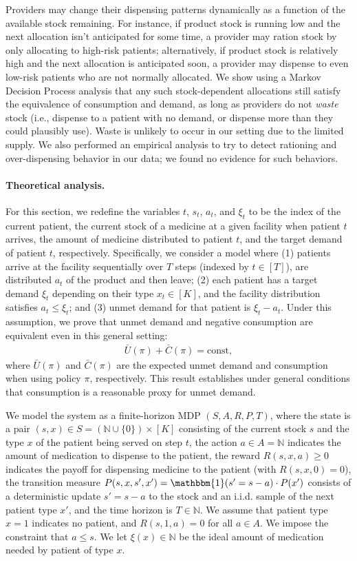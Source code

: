\documentclass[12pt]{article}
\begin{document}
Providers may change their dispensing patterns dynamically as a function of the available stock remaining. For instance, if product stock is running low and the next allocation isn't anticipated for some time, a provider may ration stock by only allocating to high-risk patients; alternatively, if product stock is relatively high and the next allocation is anticipated soon, a provider may dispense to even low-risk patients who are not normally allocated. We show using a Markov Decision Process analysis that any such stock-dependent allocations still satisfy the equivalence of consumption and demand, as long as providers do not \textit{waste} stock (i.e., dispense to a patient with no demand, or dispense more than they could plausibly use). Waste is unlikely to occur in our setting due to the limited supply. We also performed an empirical analysis to try to detect rationing and over-dispensing behavior in our data; we found no evidence for such behaviors.

\paragraph{Theoretical analysis.} For this section, we redefine the variables $t$, $s_t$, $a_t$, and $\xi_t$ to be the index of the current patient, the current stock of a medicine at a given facility when patient $t$ arrives, the amount of medicine distributed to patient $t$, and the target demand of patient $t$, respectively. Specifically, we consider a model where (1) patients arrive at the facility sequentially over $T$ steps (indexed by $t\in[T]$), are distributed $a_t$ of the product and then leave; (2) each patient has a target demand $\xi_t$ depending on their type $x_t\in[K]$, and the facility distribution satisfies $a_t\le\xi_t$; and (3) unmet demand for that patient is $\xi_t-a_t$. Under this assumption, we prove that unmet demand and negative consumption are equivalent even in this general setting:
\begin{align*}
\bar{U}(\pi)+\bar{C}(\pi)=\text{const},
\end{align*}
where $\bar{U}(\pi)$ and $\bar{C}(\pi)$ are the expected unmet demand and consumption when using policy $\pi$, respectively. This result establishes under general conditions that consumption is a reasonable proxy for unmet demand.

We model the system as a finite-horizon MDP $(S,A,R,P,T)$, where the state is a pair $(s,x)\in S=(\mathbb{N}\cup\{0\})\times[K]$ consisting of the current stock $s$ and the type $x$ of the patient being served on step $t$, the action $a\in A=\mathbb{N}$ indicates the amount of medication to dispense to the patient, the reward $R(s,x,a)\ge0$ indicates the payoff for dispensing medicine to the patient (with $R(s,x,0)=0$), the transition measure $P(s,x,s',x')=\mathbbm{1}(s'=s-a)\cdot P(x')$ consists of a deterministic update $s'=s-a$ to the stock and an i.i.d. sample of the next patient type $x'$, and the time horizon is $T\in\mathbb{N}$. We assume that patient type $x=1$ indicates no patient, and $R(s,1,a)=0$ for all $a\in A$.
We impose the constraint that $a\le s$. We let $\xi(x)\in\mathbb{N}$ be the ideal amount of medication needed by patient of type $x$.
\end{document}
